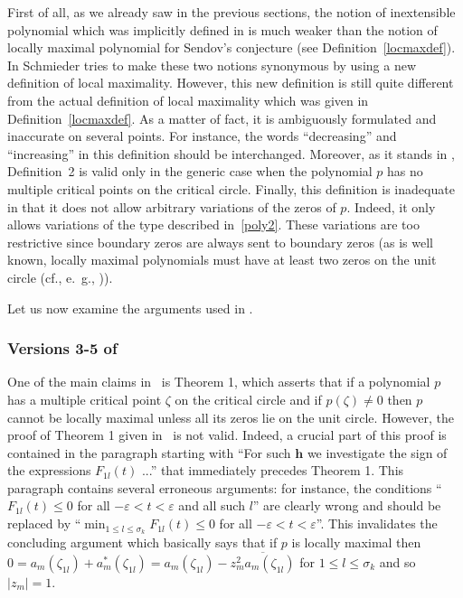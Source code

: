 \documentclass[10pt,twoside,a4paper,reqno]{amsart}
\theoremstyle{plain}
\theoremstyle{definition}
\begin{document}
{First of all, as we already saw in the previous sections, the notion of 
inextensible 
polynomial which was implicitly defined in \cite[v1-v2]{S1} is much weaker 
than the notion of locally maximal polynomial for Sendov's conjecture (see 
Definition~\ref{locmaxdef}). In 
\cite[v3-v7, Definition 2]{S1} Schmieder tries to make these two notions 
synonymous by using a new definition of local maximality.
However, this new definition is still quite different from the actual
definition 
of local maximality which was given in Definition~\ref{locmaxdef}. As a 
matter of fact, it is ambiguously formulated and inaccurate on several points.
For instance, the words ``decreasing'' and ``increasing'' in this definition 
should be interchanged. Moreover, as it stands in 
\cite[v3-v7]{S1}, Definition~2 is valid only in the generic case when the 
polynomial $p$ has 
no multiple critical points on the critical circle. Finally, this definition 
is inadequate in that it does not allow arbitrary variations of the zeros of 
$p$. Indeed, it only allows
variations of the type described in~\eqref{poly2}. These variations are too 
restrictive since boundary zeros are always sent to boundary zeros (as is 
well known, locally maximal polynomials must have at least two zeros on the 
unit circle (cf., e.~g., \cite{PR})). 

Let us now examine the arguments used in \cite[v3-v8]{S1}.

\subsubsection*{Versions 3-5 of~\cite{S1}} One of the main claims 
in~\cite[v3-v5]{S1} is 
Theorem 1, which asserts that if a polynomial $p$ has a multiple critical point
$\zeta$ on the critical circle and if $p(\zeta)\neq 0$ then $p$ cannot be 
locally maximal unless all its zeros lie on the unit circle. However, the 
proof of Theorem 1
given in~\cite[v3-v5]{S1} is not valid. Indeed, a crucial part of this proof 
is contained in the paragraph starting with 
``For such $\mathbf{h}$ we investigate the sign of the expressions 
$F_{1l}(t)$ ...'' that immediately precedes Theorem 1. This paragraph 
contains several erroneous arguments: for instance, the conditions 
``$F_{1l}(t)\le 0$ for 
all $-\varepsilon<t<\varepsilon$ and all such $l$'' are clearly wrong and 
should be replaced by  ``$\min_{1\le l\le \sigma_k}F_{1l}(t)\le 0$ for 
all $-\varepsilon<t<\varepsilon$''. This 
invalidates the concluding argument which basically says that if $p$ is 
locally maximal then 
$0=a_m(\zeta_{1l})+a_{m}^{*}(\zeta_{1l})=a_m(\zeta_{1l})
-\overline{z_{m}^2a_m(\zeta_{1l})}$ for 
$1\le l\le \sigma_k$ and so $|z_m|=1$.

}
\end{document}
